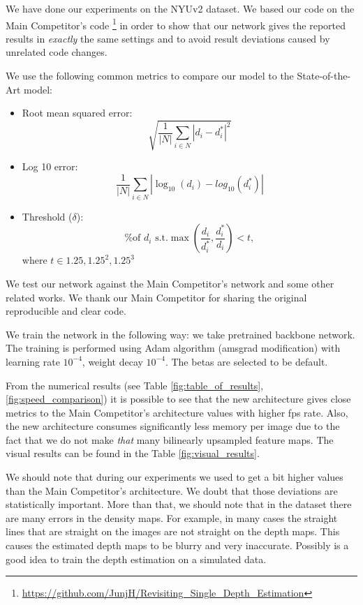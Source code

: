 \documentclass[10pt,twocolumn,letterpaper]{article}
\begin{document}
We have done our experiments on the NYUv2 dataset. We based our code on the
Main Competitor's code {\footnote{\url{https://github.com/JunjH/Revisiting_Single_Depth_Estimation}}} 
in order to show that our network gives the reported
results in \textit{exactly} the same settings and to avoid result deviations caused
by unrelated code changes.

We use the following common metrics to compare our model to the State-of-the-Art
model:

\begin{itemize}
\item Root mean squared error: 
\begin{equation}
    \sqrt{\frac{1}{|N|} \sum_{i \in N} |d_i - d_i^*|^2}
\end{equation}
\item Log 10 error:
\begin{equation}
  \frac{1}{|N|} \sum_{i \in N} |\log_{10}(d_i) - log_{10}(d_i^*)|
\end{equation}
\item Threshold ($\delta$):
\begin{equation}
    \text{\% of $d_i$ s.t.} \max{\left(\frac{d_i}{d_i^*}, \frac{d_i^*}{d_i}\right) < t},
\end{equation}
where
$t \in {1.25, 1.25^2, 1.25^3}$
\end{itemize}

We test our network against the Main Competitor's network and some other
related works. We thank our Main Competitor for sharing the original reproducible and
clear code.

We train the network in the following way: we take pretrained backbone network. The
training is performed using Adam algorithm (amsgrad modification) with learning rate
$10^{-4}$, weight decay $10^{-4}$. The betas are selected to be default.

From the numerical results (see Table \ref{fig:table_of_results}, \ref{fig:speed_comparison}) it is possible to see that the new architecture gives close metrics to the Main Competitor's architecture values with higher fps rate. Also, the new architecture consumes significantly less memory per image due to the fact that we do not make \textit{that} many bilinearly upsampled feature maps. The visual results can be found in the Table \ref{fig:visual_results}.

We should note that during our experiments we used to get a bit higher values than the Main Competitor's architecture. We doubt that those deviations are statistically important. More than that, we should note that in the dataset there are many errors in the density maps. For example, in many cases the straight lines that are straight on the images are not straight on the depth maps. This causes the estimated depth maps to be blurry and very inaccurate. Possibly is a good idea to train the depth estimation on
a simulated data.
\end{document}
